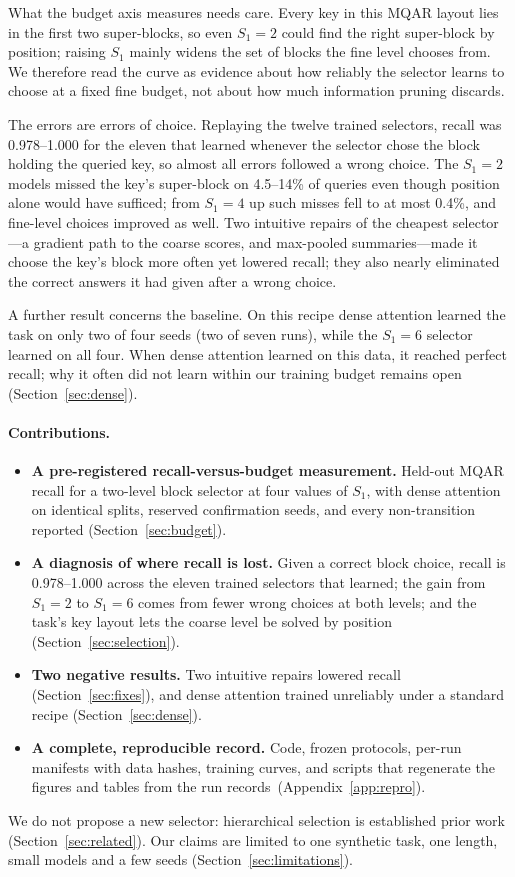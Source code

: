What the budget axis measures needs care. Every key in this MQAR layout lies in the first two super-blocks, so even
$S_1{=}2$ could find the right super-block by position; raising $S_1$ mainly widens the set of blocks the fine level
chooses from. We therefore read the curve as evidence about how reliably the selector learns to choose at a fixed
fine budget, not about how much information pruning discards.

The errors are errors of choice. Replaying the twelve trained selectors, recall was 0.978--1.000 for the eleven that
learned whenever the selector chose the block holding the queried key, so almost all errors followed a wrong choice. The $S_1{=}2$ models
missed the key's super-block on 4.5--14\% of queries even though position alone would have sufficed; from $S_1{=}4$ up
such misses fell to at most 0.4\%, and fine-level choices improved as well. Two intuitive repairs
of the cheapest selector---a gradient path to the coarse scores, and max-pooled summaries---made it choose the key's
block more often yet lowered recall; they also nearly eliminated the correct answers it had given after a wrong choice.

A further result concerns the baseline. On this recipe dense attention learned the task on only two of four seeds
(two of seven runs), while the $S_1{=}6$ selector learned on all four. When dense attention learned on this data, it
reached perfect recall; why it often did not learn within our training budget remains open (Section~\ref{sec:dense}).

\paragraph{Contributions.}
\begin{itemize}
\item \textbf{A pre-registered recall-versus-budget measurement.} Held-out MQAR recall for a two-level block selector
at four values of $S_1$, with dense attention on identical splits, reserved confirmation seeds, and every
non-transition reported (Section~\ref{sec:budget}).
\item \textbf{A diagnosis of where recall is lost.} Given a correct block choice, recall is 0.978--1.000 across the
eleven trained selectors that learned; the gain from $S_1{=}2$ to $S_1{=}6$ comes from fewer wrong choices at both
levels; and the task's key layout lets the coarse level be solved by position (Section~\ref{sec:selection}).
\item \textbf{Two negative results.} Two intuitive repairs lowered recall (Section~\ref{sec:fixes}), and dense attention
trained unreliably under a standard recipe (Section~\ref{sec:dense}).
\item \textbf{A complete, reproducible record.} Code, frozen protocols, per-run manifests with data hashes, training
curves, and scripts that regenerate the figures and tables from the run records~(Appendix~\ref{app:repro}).
\end{itemize}

We do not propose a new selector: hierarchical selection is established prior work (Section~\ref{sec:related}). Our
claims are limited to one synthetic task, one length, small models and a few seeds (Section~\ref{sec:limitations}).
